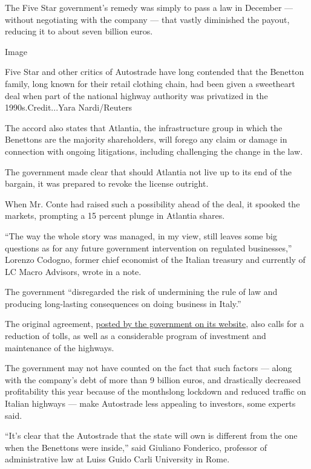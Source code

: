 The Five Star government's remedy was simply to pass a law in December
--- without negotiating with the company --- that vastly diminished the
payout, reducing it to about seven billion euros.

Image

Five Star and other critics of Autostrade have long contended that the
Benetton family, long known for their retail clothing chain, had been
given a sweetheart deal when part of the national highway authority was
privatized in the 1990s.Credit...Yara Nardi/Reuters

The accord also states that Atlantia, the infrastructure group in which
the Benettons are the majority shareholders, will forego any claim or
damage in connection with ongoing litigations, including challenging the
change in the law.

The government made clear that should Atlantia not live up to its end of
the bargain, it was prepared to revoke the license outright.

When Mr. Conte had raised such a possibility ahead of the deal, it
spooked the markets, prompting a 15 percent plunge in Atlantia shares.

``The way the whole story was managed, in my view, still leaves some big
questions as for any future government intervention on regulated
businesses,'' Lorenzo Codogno, former chief economist of the Italian
treasury and currently of LC Macro Advisors, wrote in a note.

The government ``disregarded the risk of undermining the rule of law and
producing long-lasting consequences on doing business in Italy.''

The original agreement,
\href{http://www.governo.it/it/articolo/comunicato-stampa-del-consiglio-dei-ministri-n-56/14932}{posted
by the government on its website}, also calls for a reduction of tolls,
as well as a considerable program of investment and maintenance of the
highways.

The government may not have counted on the fact that such factors ---
along with the company's debt of more than 9 billion euros, and
drastically decreased profitability this year because of the monthslong
lockdown and reduced traffic on Italian highways --- make Autostrade
less appealing to investors, some experts said.

``It's clear that the Autostrade that the state will own is different
from the one when the Benettons were inside,'' said Giuliano Fonderico,
professor of administrative law at Luiss Guido Carli University in Rome.

